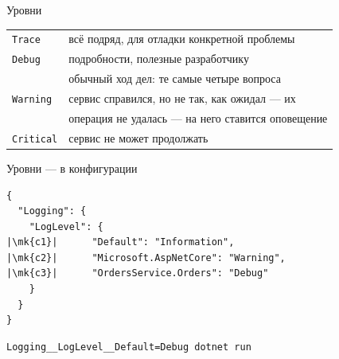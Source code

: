 \documentclass[aspectratio=169,10pt,t]{beamer}
\newcommand{\codesm}{\ttfamily\fontsize{7.6}{9.0}\selectfont}
\newcommand{\mk}[1]{\tikz[remember picture,overlay]\coordinate (#1) at (0,0.55ex);}
\begin{document}
\begin{frame}{Уровни}
  \slidetop
  {\renewcommand{\arraystretch}{1.25}
  \begin{tabular}{@{}L{3.2cm}L{10.0cm}@{}}
    \texttt{Trace}            & всё подряд, для отладки конкретной проблемы \\
    \texttt{Debug}            & подробности, полезные разработчику \\
     & обычный ход дел: те самые четыре вопроса \\
    \texttt{Warning}          & сервис справился, но не так, как ожидал --- их
       \\
           & операция не удалась --- на него ставится оповещение \\
    \texttt{Critical}         & сервис не может продолжать \\
  \end{tabular}}

  \slidegap
\end{frame}

\begin{frame}[fragile]{Уровни --- в конфигурации}
  \slidetop
\begin{lstlisting}[style=json,basicstyle=\codesm,escapechar=|]
{
  "Logging": {
    "LogLevel": {
|\mk{c1}|      "Default": "Information",
|\mk{c2}|      "Microsoft.AspNetCore": "Warning",
|\mk{c3}|      "OrdersService.Orders": "Debug"
    }
  }
}
\end{lstlisting}

\begin{lstlisting}[style=bash,basicstyle=\codesm]
Logging__LogLevel__Default=Debug dotnet run
\end{lstlisting}

\end{frame}
\end{document}
